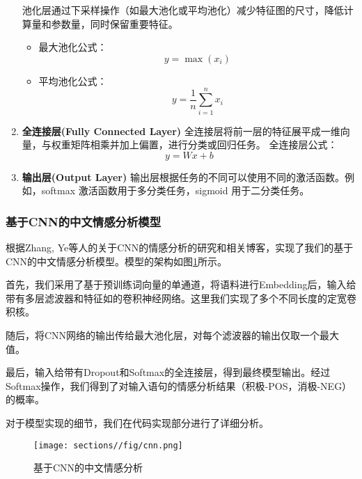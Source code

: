 \begin{enumerate}
    池化层通过下采样操作（如最大池化或平均池化）减少特征图的尺寸，降低计算量和参数量，同时保留重要特征。
    \begin{itemize}
        \item 最大池化公式：
        \begin{equation}
            y = \max(x_i)
        \end{equation}
        \item 平均池化公式：
        \begin{equation}
            y = \frac{1}{n} \sum_{i=1}^{n} x_i
        \end{equation}
    \end{itemize}
    \item \textbf{全连接层(Fully Connected Layer)}\newline
    全连接层将前一层的特征展平成一维向量，与权重矩阵相乘并加上偏置，进行分类或回归任务。\newline
    全连接层公式：
    \begin{equation}
        y = Wx + b
    \end{equation}
    \item \textbf{输出层(Output Layer)}\newline
    输出层根据任务的不同可以使用不同的激活函数。例如，softmax 激活函数用于多分类任务，sigmoid 用于二分类任务。
\end{enumerate}
\subsubsection{基于CNN的中文情感分析模型}

根据Zhang, Ye等人\cite{zhang2015sensitivity}的关于CNN的情感分析的研究和相关博客\cite{CNN-text-classification-tf}，实现了我们的基于CNN的中文情感分析模型。模型的架构如图\ref{fig:CNN}所示。

首先，我们采用了基于预训练词向量的单通道，将语料进行Embedding后，输入给带有多层滤波器和特征如的卷积神经网络。这里我们实现了多个不同长度的定宽卷积核。

随后，将CNN网络的输出传给最大池化层，对每个滤波器的输出仅取一个最大值。

最后，输入给带有Dropout和Softmax的全连接层，得到最终模型输出。经过Softmax操作，我们得到了对输入语句的情感分析结果（积极-POS，消极-NEG）的概率。

对于模型实现的细节，我们在代码实现部分进行了详细分析。

\begin{figure}[H]
    \centering
    \texttt{[image: sections//fig/cnn.png]}
    \caption{基于CNN的中文情感分析}
    \label{fig:CNN}
\end{figure}

